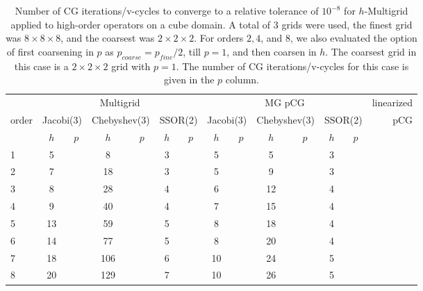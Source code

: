 \begin{table}
  \caption{\label{tab:box3}  Number of CG iterations/v-cycles to converge to a relative tolerance of $10^{-8}$ for $h$-Multigrid applied to high-order operators on a cube domain. A total of 3 grids were used, the finest grid was $8\times 8\times 8$, and the coarsest was $2\times 2\times 2$. For orders $2,4$, and $8$, we also evaluated the option of first coarsening in $p$ as $p_{coarse} = p_{fine}/2$, till $p=1$, and then coarsen in $h$. The coarsest grid in this case is a $2\times 2\times 2$ grid with $p=1$. The number of CG iterations/v-cycles for this case is given in the $p$ column.}
		\centering
    \begin{tabular}{|l|c|c|c|c|c|c|c|c|c|c|c|c|r|} 
	    \hline
						        & \multicolumn{6}{c|}{Multigrid} & \multicolumn{6}{c|}{MG pCG} &          linearized \\
																 \cline{2-13}
									order &  \multicolumn{2}{c|}{\scriptsize  Jacobi(3)} &  \multicolumn{2}{c|}{\scriptsize Chebyshev(3)} & \multicolumn{2}{c|}{\scriptsize  SSOR(2)} & \multicolumn{2}{c|}{\scriptsize Jacobi(3)} &  \multicolumn{2}{c|}{\scriptsize Chebyshev(3)} & \multicolumn{2}{c|}{\scriptsize SSOR(2)} & pCG\\
						\hline
						 & $h$ & $p$ & $h$ & $p$& $h$ & $p$& $h$ & $p$& $h$ & $p$& $h$ & $p$& \\
						 \cline{2-13}
	1 & 5 & & 8 & & 3 & & 5 & & 5 & & 3 & & \\
  2 & 7 & & 18 & & 3 & & 5 & & 9 & & 3 & & \\
  3 & 8 & & 28 & & 4 & & 6 & & 12 & & 4 & & \\
  4 & 9 & & 40 & & 4 & & 7 & & 15 & & 4 & & \\
  5 & 13 & & 59 & & 5 & & 8 & & 18 & & 4 & & \\
  6 & 14 & & 77 & & 5 & & 8 & & 20 & & 4 & & \\ 
  7 & 18 & & 106 & & 6 & & 10 & & 24 & & 5 & & \\
  8 & 20 & & 129 & & 7 & & 10 & & 26 & & 5 & & \\
			\hline
	  \end{tabular}
\end{table}

